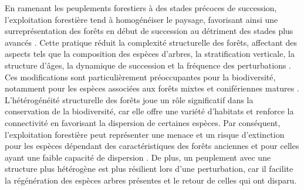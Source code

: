 En ramenant les peuplements forestiers à des stades précoces de succession, l'exploitation forestière tend à homogénéiser le paysage, favorisant ainsi une surreprésentation des forêts en début de succession 
au détriment des stades plus avancés \citep{Cyr2009Forestmanagement,Boucher2017Cumulativepatterns}. 
Cette pratique réduit la complexité structurelle des forêts, affectant des aspects tels que la composition des espèces d'arbres, la stratification verticale, la structure d'âges, 
la dynamique de succession et la fréquence des perturbations \citep{Commarmot2005Structurevirgin}. 
Ces modifications sont particulièrement préoccupantes pour la biodiversité, notamment pour les espèces associées aux forêts mixtes et conifériennes matures \citep{Tremblay2018Harvestinginteracts,Cadieux2020Projectedeffects}.
L'hétérogénéité structurelle des forêts joue un rôle significatif dans la conservation de la biodiversité, car elle offre une variété d'habitats et renforce la connectivité en favorisant la dispersion de certaines espèces. 
Par conséquent, l'exploitation forestière peut représenter une menace et un risque d'extinction pour les espèces dépendant des caractéristiques des forêts anciennes et pour celles ayant une faible capacité de dispersion \citep{Norden2001Conceptualproblems,Martin2021indicatorspecies}. 
De plus, un peuplement avec une structure plus hétérogène est plus résilient lors d'une perturbation, car il facilite la régénération des espèces arbres présentes et le retour de celles qui ont disparu. 

